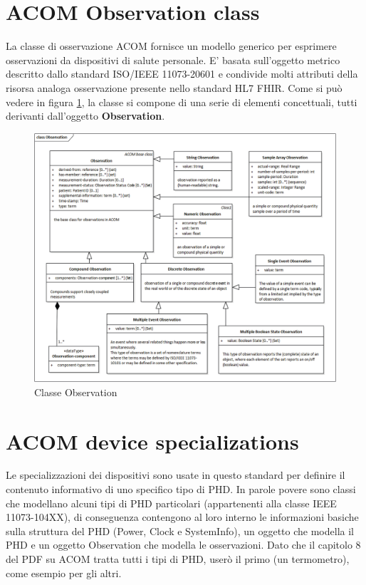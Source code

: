 \documentclass[a4paper]{article}
\begin{document}
    \section{ACOM Observation class}
    La classe di osservazione ACOM fornisce un modello generico per esprimere osservazioni da dispositivi di salute personale.
    E' basata sull'oggetto metrico descritto dallo standard ISO/IEEE 11073-20601 e condivide molti attributi della risorsa analoga osservazione presente nello standard HL7 FHIR.
    Come si può vedere in figura \ref{fig:observationClass}, la classe si compone di una serie di elementi concettuali, tutti derivanti dall'oggetto \textbf{Observation}.  
    \begin{figure}[H]
        \centering
        \includegraphics[width=1\textwidth]{figures/observation class.png}
        \caption{Classe Observation}
        \label{fig:observationClass}
    \end{figure}
    
\section{ACOM device specializations}
    Le specializzazioni dei dispositivi sono usate in questo standard per definire il contenuto informativo di uno specifico tipo di PHD.
    In parole povere sono classi che modellano alcuni tipi di PHD particolari (appartenenti alla classe IEEE 11073-104XX), di conseguenza contengono al loro interno le informazioni basiche sulla struttura del PHD (Power, Clock e SystemInfo), 
    un oggetto che modella il PHD e un oggetto Observation che modella le osservazioni. 
    Dato che il capitolo 8 del PDF su ACOM tratta tutti i tipi di PHD, userò il primo (un termometro), come esempio per gli altri.
    \newpage
\end{document}
